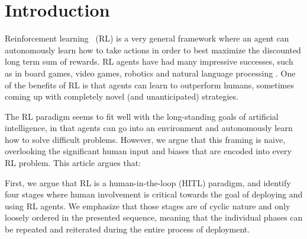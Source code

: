 \documentclass[twoside,11pt]{article}
\begin{document}
\section{Introduction}
\label{sec:introduction}

%


Reinforcement learning~\citep{SuttonBarto:2018:RLIntroduction} (RL) is a very general framework where an agent can autonomously learn how to take actions in order to best maximize the discounted long term sum of rewards. RL agents have had many impressive successes, such as in board games, video games, robotics and natural language processing \citep{Li:2017:DRLSurvey}. One of the benefits of RL is that agents can learn to outperform humans, sometimes coming up with completely novel (and unanticipated) strategies.

The RL paradigm seems to fit well with the long-standing goals of artificial intelligence, in that agents can go into an environment and autonomously learn how to solve difficult problems. However, we argue that this framing is naive, overlooking the significant human input and biases that are encoded into every RL problem. This article argues that: 
\begin{center}
\end{center}

First, we argue that RL is a human-in-the-loop (HITL) paradigm, and identify four stages where human involvement is critical towards the goal of deploying and using RL agents. We emphasize that those stages are of cyclic nature and only loosely ordered in the presented sequence, meaning that the individual phases can be repeated and reiterated during the entire process of deployment.
\end{document}
